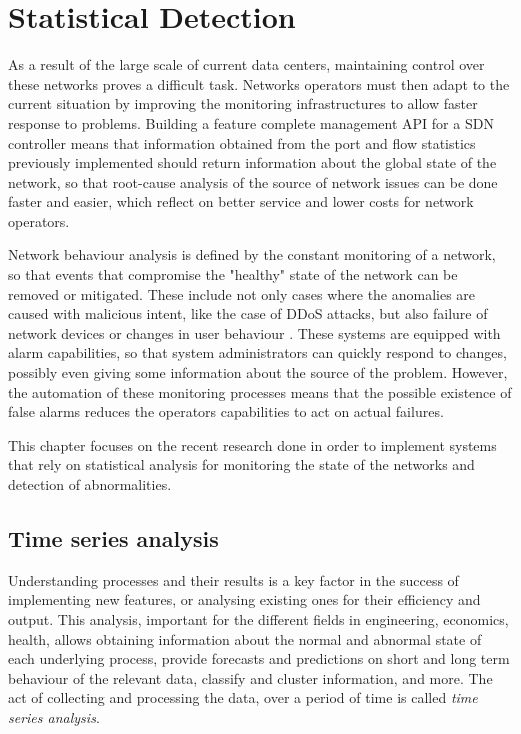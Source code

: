 \section{Statistical Detection} \label{chap:stat_det}

As a result of the large scale of current data centers, maintaining control over these networks proves a difficult task. Networks operators must then adapt to the
current situation by improving the monitoring infrastructures to allow faster response to problems.  Building a feature complete management API for a SDN controller 
means that information obtained from the port and flow statistics previously implemented should return information about the global state of the network, so that
root-cause analysis of the source of network issues can be done faster and easier, which reflect on better service and lower costs for network operators. 

\par Network behaviour analysis is defined by the constant monitoring of a network, so that events that compromise the "healthy" state of the network can be
removed or mitigated. These include not only cases where the anomalies are caused with malicious intent, like the case of DDoS attacks, but also failure of network 
devices or changes in user behaviour \cite{munz_traffic_2010}. These systems are equipped with alarm capabilities, so that system administrators can quickly respond
to changes, possibly even giving some information about the source of the problem. However, the automation of these monitoring processes means that the possible 
existence of false alarms reduces the operators capabilities to act on actual failures. 

\par This chapter focuses on the recent research done in order to implement systems that rely on statistical analysis for monitoring the state of the networks and
detection of abnormalities.

\subsection {Time series analysis}

Understanding processes and their results is a key factor in the success of implementing new features, or analysing existing ones for their efficiency and output.
This analysis, important for the different fields in engineering, economics, health, allows obtaining information about the normal and abnormal state of each 
underlying process, provide forecasts and predictions on short and long term behaviour of the relevant data, classify and cluster information, and more. The act of 
collecting and processing the data, over a period of time is called \textit{time series analysis}. 

